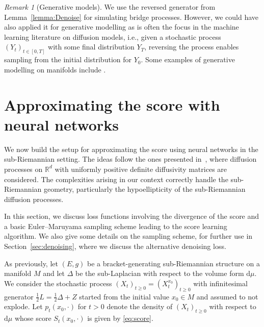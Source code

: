 \documentclass[10pt]{amsart}
\newcounter{dummy} \numberwithin{dummy}{section}
\theoremstyle{remark}
\newtheorem{remark}[dummy]{Remark}
\newcommand{\R}{\mathbb{R}}
\newcommand{\db}{{\mathrm d}}
\numberwithin{equation}{section}
\begin{document}
\begin{remark}[Generative models]
We use the reversed generator from Lemma~\ref{lemma:Denoise} for simulating bridge processes. However, we could have also applied it for generative modelling as is often the focus in the machine learning literature on diffusion models, i.e., given a stochastic process $(Y_t)_{t\in[0,T]}$ with some final distribution $Y_T$, reversing the process enables sampling from the initial distribution for $Y_0$. Some examples of generative modelling on manifolds include \cite{bortoliRiemannianScoreBasedGenerative2022,huangRiemannianDiffusionModels2022}.
\end{remark}


\section{Approximating the score with neural networks}
\label{sec:score}
We now build the setup for approximating the score using neural networks in the sub-Riemannian setting. 
The ideas follow the ones presented in~\cite{HdBDT21}, where diffusion processes on $\R^d$ with uniformly positive definite diffusivity matrices are considered. The complexities arising in our context correctly handle the sub-Riemannian geometry, particularly the hypoellipticity of the sub-Riemannian diffusion processes.

In this section, we discuss loss functions involving the divergence of the score and a basic Euler--Maruyama sampling scheme leading to the score learning algorithm. We also give some details on the sampling scheme, for further use in Section~\ref{sec:denoising}, where we discuss the alternative denoising loss.

As previously, let $(E,g)$ be a bracket-generating sub-Riemannian structure on a manifold $M$ and let $\Delta$ be the sub-Laplacian with respect to the volume form $\db\mu$. We consider the stochastic process $(X_t)_{t\geq 0}=(X_t^{x_0})_{t\geq 0}$ with infinitesimal generator $\frac{1}{2} L = \frac{1}{2} \Delta + Z$ started from the initial value $x_0\in M$ and assumed to not explode. Let $p_t(x_0, \cdot)$ for $t>0$ denote the density of $(X_t)_{t\geq 0}$ with respect to $\db\mu$ whose score $S_t(x_0,\cdot)$ is given by \eqref{eq:score}.
\end{document}
